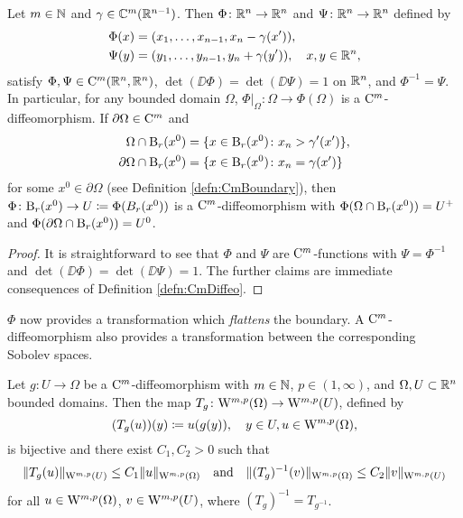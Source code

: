 \begin{lem}
  \label{lem:flattening}
  Let $m \in \mathbb{N}$ and $\gamma \in \mathbb{C}^m(\mathbb{R}^{n - 1})$.
  Then $\Phi \colon \mathbb{R}^n \to \mathbb{R}^n$ and $\Psi \colon \mathbb{R}^n \to \mathbb{R}^n$ defined by
  \begin{align*}
    \Phi(x) &= (x_1,\dots,x_{n - 1}, x_n - \gamma(x')),\\
    \Psi(y) &= (y_1,\dots,y_{n - 1}, y_n + \gamma(y')), \quad x,y \in \mathbb{R}^n,
  \end{align*}
  satisfy $\Phi,\Psi \in \mathrm{C}^m(\mathbb{R}^n,\mathbb{R}^n)$, $\det(\DD\Phi) = \det(\DD \Psi) =1$ on $\mathbb{R}^n$, and $\Phi^{-1} = \Psi$.
  In particular, for any bounded domain $\Omega$, $\Phi|_\Omega \colon \Omega \to \Phi(\Omega)$ is a $\mathrm{C}^m$\hyp{}diffeomorphism.
  If $\partial \Omega \in \mathrm{C}^m$ and 
  \begin{align*}
    \Omega \cap \mathrm{B}_r(x^0) &= \{ x \in \mathrm{B}_r(x^0) \colon x_n > \gamma'(x')\},\\
    \partial \Omega \cap \mathrm{B}_r(x^0) &= \{ x \in \mathrm{B}_r(x^0) \colon x_n = \gamma(x')\}
  \end{align*}
  for some $x^0 \in \partial \Omega$ (see Definition \ref{defn:CmBoundary}), then $\Phi\colon \mathrm{B}_r(x^0) \to U \coloneqq \Phi(B_r(x^0))$ is a $\mathrm{C}^m$\hyp{}diffeomorphism with $\Phi(\Omega \cap \mathrm{B}_r(x^0)) = U^+$ and $\Phi(\partial\Omega \cap \mathrm{B}_r(x^0)) = U^0$.
\end{lem}

\begin{proof}
  It is straightforward to see that $\Phi$ and $\Psi$ are $\mathrm{C}^m$-functions with $\Psi = \Phi^{-1}$ and $\det(\DD\Phi) = \det(\DD\Psi) = 1$.
  The further claims are immediate consequences of Definition \ref{defn:CmDiffeo}.
\end{proof}

$\Phi$ now provides a transformation which \emph{flattens} the boundary.
A $\mathrm{C}^m$\hyp{}diffeomorphism also provides a transformation between the corresponding Sobolev spaces.

\begin{prop}
  \label{prop:sobolevTransform}
  Let $g \colon U \to \Omega$ be a $\mathrm{C}^m$\hyp{}diffeomorphism with $m \in \mathbb{N}$, $p \in (1,\infty)$, and $\Omega,U \subset \mathbb{R}^n$ bounded domains.
  Then the map $T_g \colon \mathrm{W}^{m,p}(\Omega) \to \mathrm{W}^{m,p}(U)$, defined by
  $$
  (T_g(u))(y) \coloneqq u(g(y)), \quad y \in U, u \in \mathrm{W}^{m,p}(\Omega),
  $$
  is bijective and there exist $C_1, C_2 > 0$ such that
  $$
  \|T_g(u)\|_{\mathrm{W}^{m,p}(U)} \leq C_1 \|u\|_{\mathrm{W}^{m,p}(\Omega)}
  \quad\text{and}\quad
  \|(T_g)^{-1}(v)\|_{\mathrm{W}^{m,p}(\Omega)} \leq C_2 \|v\|_{\mathrm{W}^{m,p}(U)}
  $$
  for all $u \in \mathrm{W}^{m,p}(\Omega)$, $v \in \mathrm{W}^{m,p}(U)$, where $(T_g)^{-1} = T_{g^{-1}}$.
\end{prop}

